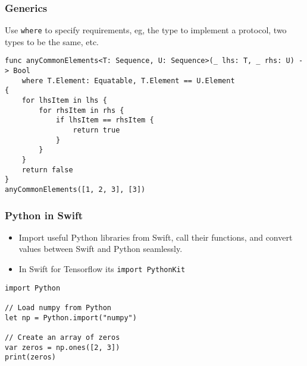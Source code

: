 \begin{frame}[fragile] \frametitle{Generics}

Use \lstinline|where| to specify requirements, eg, the type to implement a protocol, two types to be the same, etc.

\begin{lstlisting}
func anyCommonElements<T: Sequence, U: Sequence>(_ lhs: T, _ rhs: U) -> Bool
    where T.Element: Equatable, T.Element == U.Element
{
    for lhsItem in lhs {
        for rhsItem in rhs {
            if lhsItem == rhsItem {
                return true
            }
        }
    }
    return false
}
anyCommonElements([1, 2, 3], [3])
\end{lstlisting}
\end{frame}


\begin{frame}[fragile] \frametitle{Python in Swift}

\begin{itemize}
\item Import useful Python libraries from Swift, call their functions, and convert values between Swift and Python seamlessly.
\item In Swift for Tensorflow its \lstinline|import PythonKit|
\end{itemize}

\begin{lstlisting}
import Python

// Load numpy from Python
let np = Python.import("numpy")

// Create an array of zeros
var zeros = np.ones([2, 3])
print(zeros)
\end{lstlisting}
\end{frame}
